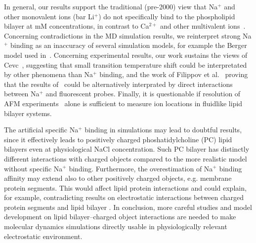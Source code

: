 \documentclass[pre,aps,floatfix,authordate1-4,twocolumn]{revtex4-1}
\begin{document}
In general, our results support the traditional (pre-2000) view that Na$^+$ and other monovalent ions (bar Li$^+$)
do not specifically bind to the phospholipid bilayer at mM concentrations, in contrast to Ca$^{2+}$ and other multivalent 
ions~\cite{eisenberg79,akutsu81,altenbach84,tatulian87,cevc90,tocanne90,clarke99,binder02,pabst07,filippov09}.
Concerning contradictions in the MD simulation results, we reinterpret strong Na$^+$ binding as an inaccuracy of several simulation models,
for example the Berger model used in~\cite{bockmann03,bockmann04}. Concerning experimental results, our work sustains the views of Cevc~\cite{cevc90}, suggesting
that small transition temperature shift could be interpretated by other phenomena than Na$^+$ binding, and the work of Filippov et al.~\cite{filippov09} 
proving that the results of~\cite{bockmann03,vacha09a,harb13} could be alternatively interprated by direct interactions between Na$^+$ and fluorescent probes.
Finally, it is questionable if resolution of AFM experiments~\cite{manyes05,manyes06,fukuma07,ferber11,morata12} alone is sufficient to measure ion locations in fluidlike lipid bilayer systems. 


The artificial specific Na$^+$ binding in simulations may lead to doubtful results, since it effectively leads  to
positively charged phoshatidylcholine (PC) lipid bilayers even at physiological NaCl concentration.
Such PC bilayer has distinctly different interactions with charged objects compared to the more realistic
model without specific Na$^+$ binding. Furthermore, the overestimation of Na$^+$ binding affinity may
extend also to other positively charged objects, e.g. membrane protein segments. This would affect
lipid protein interactions and could explain, for example, contradicting results on electrostatic interactions 
between charged protein segments and lipid bilayer \cite{arkhipov13,kaszuba15}. In conclusion, 
more careful studies and model development on lipid bilayer--charged object interactions are
needed to make molecular dynamics simulations directly usable in physiologically relevant
electrostatic environment. 
\end{document}
